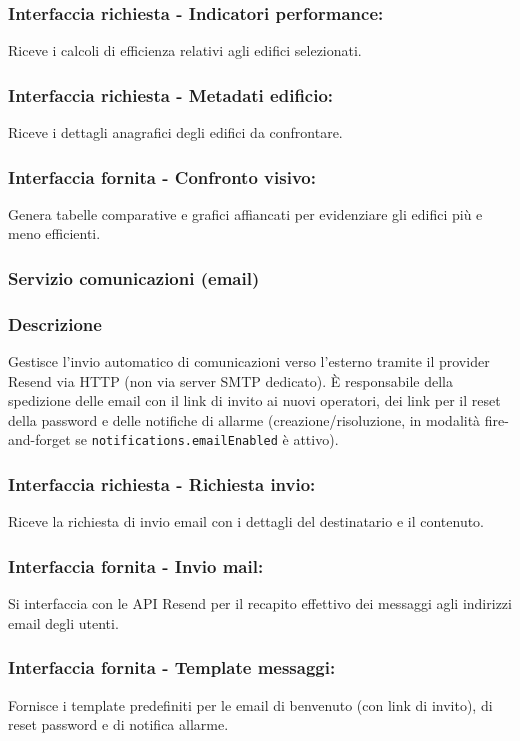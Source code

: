         \subsubsection*{Interfaccia richiesta - Indicatori performance:}
            Riceve i calcoli di efficienza relativi agli edifici selezionati.
        \subsubsection*{Interfaccia richiesta - Metadati edificio:}
            Riceve i dettagli anagrafici degli edifici da confrontare.
        \subsubsection*{Interfaccia fornita - Confronto visivo:}
            Genera tabelle comparative e grafici affiancati per evidenziare gli edifici più e meno efficienti.

    \subsubsection{Servizio comunicazioni (email)}
        \subsubsection*{Descrizione}
            Gestisce l'invio automatico di comunicazioni verso l'esterno tramite il provider Resend via HTTP (non via server SMTP dedicato). È responsabile della spedizione delle email con il link di invito ai nuovi operatori, dei link per il reset della password e delle notifiche di allarme (creazione/risoluzione, in modalit\`a fire-and-forget se \texttt{notifications.emailEnabled} \`e attivo).
        \subsubsection*{Interfaccia richiesta - Richiesta invio:}
            Riceve la richiesta di invio email con i dettagli del destinatario e il contenuto.
        \subsubsection*{Interfaccia fornita - Invio mail:}
            Si interfaccia con le API Resend per il recapito effettivo dei messaggi agli indirizzi email degli utenti.
        \subsubsection*{Interfaccia fornita - Template messaggi:}
            Fornisce i template predefiniti per le email di benvenuto (con link di invito), di reset password e di notifica allarme.

